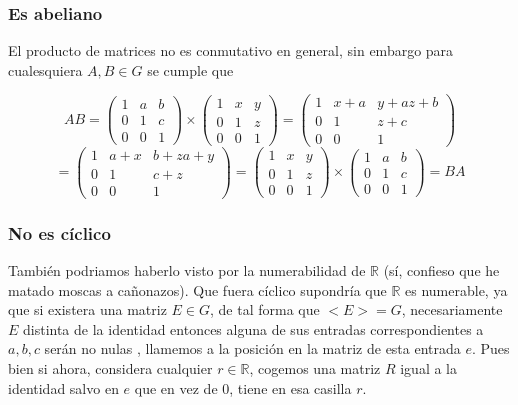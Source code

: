 \documentclass[12pt]{article}
\begin{document}
\subsubsection*{Es abeliano}

El producto de matrices no es conmutativo en general, sin embargo para cualesquiera $A,B \in G$ 
se cumple que 

\begin{equation*}
    A B = 
    \begin{pmatrix}
        1 & a & b \\
        0 & 1 & c \\
        0 & 0 & 1
    \end{pmatrix}
    \times
    \begin{pmatrix}
        1 & x & y \\
        0 & 1 & z \\
        0 & 0 & 1
    \end{pmatrix}
    = 
    \begin{pmatrix}
    1 & x+a & y + az + b\\
    0 & 1 & z + c\\
    0 & 0 & 1
    \end{pmatrix}
\end{equation*}
\begin{equation*}
    = 
    \begin{pmatrix}
        1 & a+x & b+ za + y\\
        0 & 1 & c + z \\
        0 & 0 & 1
    \end{pmatrix}
 = \begin{pmatrix}
    1 & x & y \\
    0 & 1 & z \\
    0 & 0 & 1
\end{pmatrix}
\times  
 \begin{pmatrix}
    1 & a & b \\
    0 & 1 & c \\
    0 & 0 & 1
\end{pmatrix}
= B A
\end{equation*}

\subsubsection*{No es cíclico}


También podriamos haberlo visto por la numerabilidad de $\mathbb R$
(sí, confieso que he matado moscas a cañonazos).
Que fuera cíclico supondría que $\mathbb R$ es numerable, 
ya que si existera una matriz $E \in G$, 
de tal forma que $<E>=G$, necesariamente $E$ distinta de la identidad
entonces alguna de sus entradas correspondientes a $a,b,c$ serán no nulas 
, llamemos a la posición en la matriz de esta entrada $e$.
Pues bien si ahora, considera cualquier $r \in \mathbb R$, cogemos una matriz $R$
igual a la identidad salvo en $e$ que en vez de $0$, tiene en esa casilla $r.$
\end{document}
